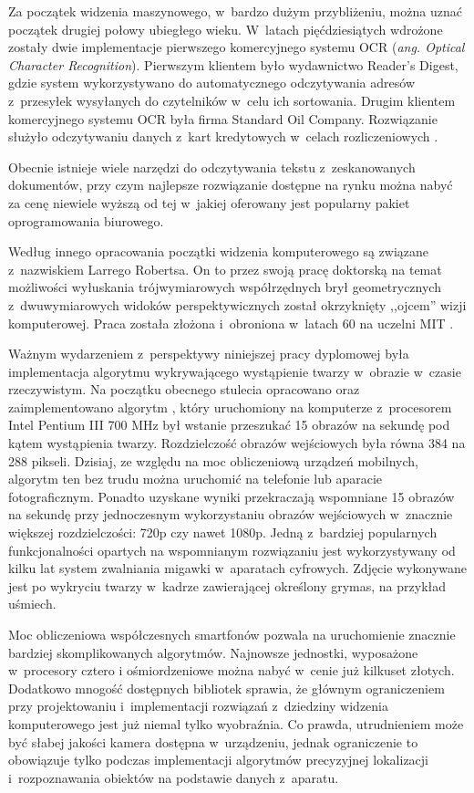 Za początek widzenia maszynowego, w~bardzo dużym przybliżeniu, można
uznać początek drugiej połowy ubiegłego wieku.
W~latach pięćdziesiątych wdrożone zostały dwie implementacje 
pierwszego komercyjnego systemu OCR (\textit{ang. Optical Character 
Recognition}). Pierwszym klientem było wydawnictwo Reader's Digest, 
gdzie system wykorzystywano do automatycznego odczytywania adresów
z~przesyłek wysyłanych do czytelników w~celu ich sortowania.
Drugim klientem komercyjnego systemu OCR 
była firma Standard Oil Company. Rozwiązanie
służyło odczytywaniu danych z~kart kredytowych w~celach 
rozliczeniowych \cite{WEB:ocrhistory}.

Obecnie istnieje wiele narzędzi do odczytywania tekstu z~zeskanowanych
dokumentów, przy czym najlepsze rozwiązanie dostępne na rynku
można nabyć za cenę niewiele wyższą od tej w~jakiej oferowany jest
popularny pakiet oprogramowania biurowego.

Według innego opracowania \cite{web:huangcvevolution}
początki widzenia komputerowego są związane z~nazwiskiem Larrego
Robertsa. On to przez swoją pracę doktorską na temat możliwości
wyłuskania trójwymiarowych współrzędnych brył geometrycznych
z~dwuwymiarowych widoków perspektywicznych został okrzyknięty
,,ojcem'' wizji komputerowej. Praca została złożona i~obroniona 
w~latach 60 na uczelni MIT \cite{books/garland/Roberts63}.

Ważnym wydarzeniem z~perspektywy niniejszej pracy dyplomowej była
implementacja algorytmu wykrywającego wystąpienie twarzy
w~obrazie w~czasie rzeczywistym.
Na początku obecnego stulecia opracowano oraz zaimplementowano algorytm
\cite{DBLP:conf/cvpr/ViolaJ01}, który uruchomiony na komputerze 
z~procesorem Intel Pentium III 700 MHz był wstanie przeszukać 15 
obrazów na sekundę pod kątem wystąpienia twarzy.
Rozdzielczość obrazów wejściowych była równa 384 na 288 pikseli.
Dzisiaj, ze względu na moc obliczeniową urządzeń mobilnych, algorytm ten 
bez trudu można uruchomić
na telefonie lub aparacie fotograficznym. 
Ponadto uzyskane wyniki przekraczają wspomniane 15 obrazów na sekundę
przy jednoczesnym wykorzystaniu obrazów wejściowych w~znacznie
większej rozdzielczości: 720p czy nawet 1080p.
Jedną z~bardziej 
popularnych funkcjonalności opartych na wspomnianym rozwiązaniu 
jest wykorzystywany od kilku lat system zwalniania migawki w~aparatach
cyfrowych.
Zdjęcie wykonywane jest
po wykryciu twarzy w~kadrze zawierającej określony grymas, na przykład
uśmiech.

Moc obliczeniowa współczesnych smartfonów pozwala na uruchomienie
znacznie bardziej skomplikowanych algorytmów. Najnowsze jednostki,
wyposażone w~procesory cztero i ośmiordzeniowe można nabyć
w~cenie już kilkuset złotych. Dodatkowo mnogość dostępnych bibliotek 
sprawia, że głównym ograniczeniem przy projektowaniu i~implementacji
rozwiązań z~dziedziny widzenia komputerowego jest już niemal
tylko wyobraźnia. Co prawda, utrudnieniem może być słabej jakości
kamera dostępna w~urządzeniu, jednak ograniczenie to obowiązuje
tylko podczas implementacji algorytmów precyzyjnej lokalizacji
i~rozpoznawania obiektów na podstawie danych z~aparatu.

